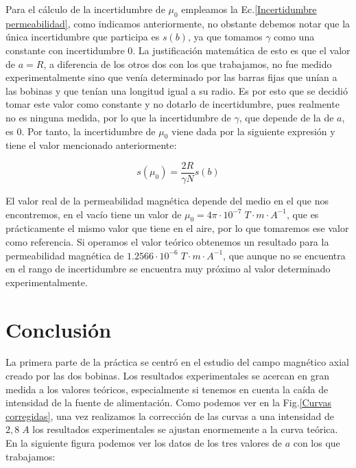 \documentclass[a4paper,12pt,titlepage]{article}
\begin{document}
Para el cálculo de la incertidumbre de $\mu_0$ empleamos la Ec.\ref{Incertidumbre permeabilidad}, como indicamos anteriormente, no obstante debemos notar que la única incertidumbre que participa es $s(b)$, ya que tomamos $\gamma$ como una constante con incertidumbre 0. La justificación matemática de esto es que el valor de $a=R$, a diferencia de los otros dos con los que trabajamos, no fue medido experimentalmente sino que venía determinado por las barras fijas que unían a las bobinas y que tenían una longitud igual a su radio. Es por esto que se decidió tomar este valor como constante y no dotarlo de incertidumbre, pues realmente no es ninguna medida, por lo que la incertidumbre de $\gamma$, que depende de la de $a$, es 0. Por tanto, la incertidumbre de $\mu_0$ viene dada por la siguiente expresión y tiene el valor mencionado anteriormente:

\begin{equation}
    s(\mu_0) = \frac{2R}{\gamma N} s(b)
\end{equation}

El valor real de la permeabilidad magnética depende del medio en el que nos encontremos, en el vacío tiene un valor de $\mu_0=4\pi\cdot 10^{-7} \; T \cdot m \cdot A^{-1}$, que es prácticamente el mismo valor que tiene en el aire, por lo que tomaremos ese valor como referencia. Si operamos el valor teórico obtenemos un resultado para la permeabilidad magnética de $1.2566 \cdot 10^{-6}\; T \cdot m \cdot A^{-1}$, que aunque no se encuentra en el rango de incertidumbre se encuentra muy próximo al valor determinado experimentalmente.

\section{Conclusión}

La primera parte de la práctica se centró en el estudio del campo magnético axial creado por las dos bobinas. Los resultados experimentales se acercan en gran medida a los valores teóricos, especialmente si tenemos en cuenta la caída de intensidad de la fuente de alimentación. Como podemos ver en la Fig.\ref{Curvas corregidas}, una vez realizamos la corrección de las curvas a una intensidad de $2,8 \;A$ los resultados experimentales se ajustan enormemente a la curva teórica. En la siguiente figura podemos ver los datos de los tres valores de $a$ con los que trabajamos:
\end{document}
